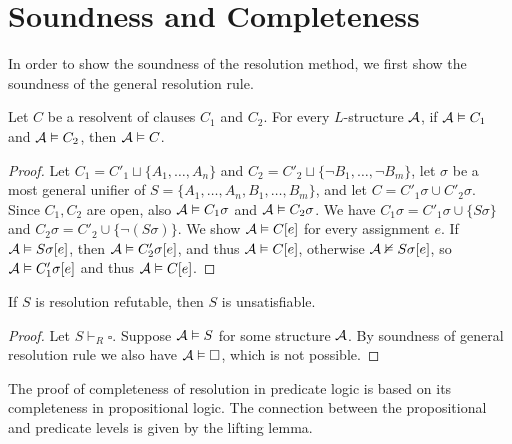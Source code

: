 \section{Soundness and Completeness}

In order to show the soundness of the resolution method, we first show the soundness of the general resolution rule.

\begin{lemma}
Let $C$ be a resolvent of clauses $C_1$ and $C_2$. For every $L$-structure $\mathcal{A}$, if $\mathcal{A} \vDash C_1$ and $\mathcal{A} \vDash C_2$, then $\mathcal{A} \vDash C$. 
\end{lemma}
\begin{proof}
Let $C_1 = C'_1 \sqcup \{A_1, \dots, A_n\}$ and $C_2 = C'_2 \sqcup \{\neg B_1, \dots, \neg B_m\}$, let $\sigma$ be a most general unifier of $S = \{A_1, \dots, A_n, B_1, \dots, B_m\}$, and let $C = C'_1 \sigma \cup C'_2 \sigma$. Since $C_1, C_2$ are open, also $\mathcal{A} \vDash C_1 \sigma$ and $\mathcal{A} \vDash C_2 \sigma$. We have $C_1 \sigma = C'_1 \sigma \cup \{S \sigma\}$ and $C_2 \sigma = C'_2 \cup \{\neg (S \sigma)\}$. We show $\mathcal{A} \vDash C[e]$ for every assignment $e$. If $\mathcal{A} \vDash S \sigma[e]$, then $\mathcal{A} \vDash C'_2 \sigma[e]$, and thus $\mathcal{A} \vDash C[e]$, otherwise $\mathcal{A} \nvDash S \sigma [e]$, so $\mathcal{A} \vDash C'_1 \sigma[e]$ and thus $\mathcal{A} \vDash C[e]$.
\end{proof}

\begin{theorem}
If $S$ is resolution refutable, then $S$ is unsatisfiable.
\end{theorem}
\begin{proof}
Let $S \vdash_R \square$. Suppose $\mathcal{A} \vDash S$ for some structure $\mathcal{A}$. By soundness of general resolution rule we also have $\mathcal{A} \vDash \square$, which is not possible.
\end{proof}

The proof of completeness of resolution in predicate logic is based on its completeness in propositional logic. The connection between the propositional and predicate levels is given by the lifting lemma.

